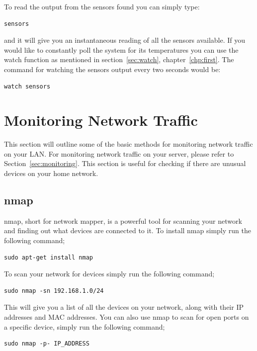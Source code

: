 To read the output from the sensors found you can simply type:

\begin{lstlisting}
sensors
\end{lstlisting}

and it will give you an instantaneous reading of all the sensors available.  If you would like to constantly poll the system for its temperatures you can use the watch function as mentioned in section~\ref{sec:watch}, chapter~\ref{chp:first}.  The command for watching the sensors output every two seconds would be:

\begin{lstlisting}
watch sensors
\end{lstlisting}


\section{Monitoring Network Traffic}
\label{sec:netmon}

This section will outline some of the basic methods for monitoring network traffic on your LAN. For monitoring network traffic on your server, please refer to Section~\ref{sec:monitoring}. This section is useful for checking if there are unusual devices on your home network.

\subsection{nmap}
\label{sec:nmap}

nmap, short for network mapper, is a powerful tool for scanning your network and finding out what devices are connected to it.  To install nmap simply run the following command;

\begin{lstlisting}
sudo apt-get install nmap
\end{lstlisting}

To scan your network for devices simply run the following command;

\begin{lstlisting}
sudo nmap -sn 192.168.1.0/24
\end{lstlisting}

This will give you a list of all the devices on your network, along with their IP addresses and MAC addresses.  You can also use nmap to scan for open ports on a specific device, simply run the following command;

\begin{lstlisting}
sudo nmap -p- IP_ADDRESS
\end{lstlisting}

